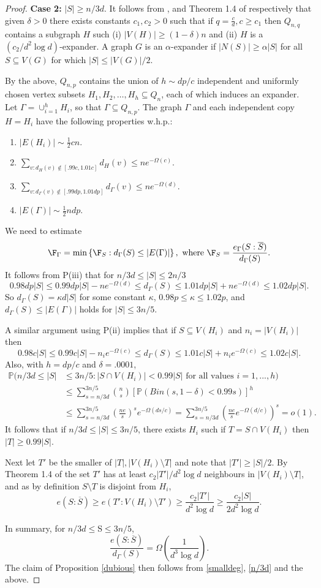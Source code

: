 \documentclass[12pt]{article}
\def\nn{\nonumber}
\def\a{\alpha} \def\b{\beta} \def\d{\delta} \def\D{\Delta}
\def\G{\Gamma} \def\i{\iota} \def\k{\kappa}\def\K{\Kappa}
\newcommand{\ol}[1]{\overline{#1}}
\newcommand{\brac}[1]{\left(#1\right)}
\newcommand{\bfrac}[2]{\left(\frac{#1}{#2}\right)}
\newcommand{\set}[1]{\left\{#1\right\}}
\def\sm{\setminus}
\def\seq{\subseteq}
\def\Pr{\mathbb{P}}
\def\nn{\nonumber}
\begin{document}
\begin{proof}
{\bf Case 2:} $|S | \ge n/3d$.
It follows from \cite{AKS}, and  Theorem 1.4  of \cite{EKK} respectively that given $\d>0$
there exists constants $c_1,c_2>0$ such that if $q=\frac{c}{d},c\geq c_1$ then $Q_{n,q}$ contains a subgraph $H$ such (i) $|V(H)|\geq (1-\d)n$ and (ii) $H$ is a $(c_2/d^2 \log d)$-expander.  A graph $G$ is an $\a$-expander if $|N(S)|\geq \a|S|$ for all $S\subseteq V(G)$ for which $|S|\leq |V(G)|/2$.

By the above, $Q_{n,p}$ contains the union of $ h\sim dp/c$ independent and uniformly chosen vertex subsets $H_1,H_2,\ldots,H_h\subseteq Q_n$, each of which induces an expander.  Let $\G=\cup_{i=1}^h H_i$,
so that $\G \seq Q_{n,p}$.
The graph $\G$ and each independent copy $H=H_i$ have the following properties w.h.p.:
\begin{enumerate}[{P(i).}]
\item $|E(H_i)|\sim \tfrac12 cn$.
\item $\displaystyle {\sum_{v:d_H(v)\notin [.99c,1.01c]}}d_H(v)\leq ne^{-\Omega(c)}$.
\item  $\displaystyle {\sum_{v:d_\G(v)\notin [.99dp,1.01dp]}}d_\G(v)\leq ne^{-\Omega(d)}$.
\item $|E(\G)|\sim \tfrac12 ndp$.
\end{enumerate}
We need to estimate
\[
\F_\G=\min\set{\F_S:d_\G(S)\leq |E(\G)|},\text{ where }\F_S=\frac{e{_\G}(S:\ol S)}{d_\G(S)}.
\]
It follows from P(iii) that for $n/3d\leq |S|\leq 2n/3$
\[
0.98dp|S|\leq 0.99dp|S|-ne^{-\Omega(d)}\leq  d_\G(S) \leq 1.01dp|S|+ne^{-\Omega(d)}\leq  1.02dp|S|.
\]
So $d_\G(S)= \k d|S|$ for some constant $\k$,
$0.98 p \le \k \le 1.02 p$,  and  $d_\G(S)\leq |E(\G)|$ holds for $|S|\leq 3n/5$.


A similar argument using P(ii) implies that if $S\subseteq V(H_i)$ and $n_i=|V(H_i)|$ then
\[
0.98c|S|\leq 0.99c|S|-n_ie^{-\Omega(c)}\leq  d_\G(S) \leq 1.01c|S|+n_ie^{-\Omega(c)}\leq 1.02c|S|.
\]
Also, with $h=dp/c$  and $\d=.0001$,
\begin{align}
\Pr(n/3d\leq |S|&\leq 3n/5: |S\cap V(H_i)|<0.99|S|\text{ for all values } i=1,...,h)\nn\\
&\leq\sum_{s=n/3d}^{3n/5}\binom{n}{s}[\Pr(Bin(s,1-\d)<0.99s)]^{h}\nn\\
&\leq\sum_{s=n/3d}^{3n/5} \bfrac{ne}{s}^se^{-\Omega(ds/c)}=\sum_{s=n/3d}^{3n/5}\brac{\frac{ne}{s}e^{-\Omega(d/c)}}^s=o(1).\label{eq2}
\end{align}
It follows that if $n/3d\leq |S|\leq 3n/5$, there exists $H_i$ such if $T=S\cap V(H_i)$ then $|T|\geq 0.99|S|$.


Next let $T'$ be the smaller of $|T|,|V(H_i)\setminus T|$ and note that $|T'|\geq |S|/2$.
By Theorem 1.4 of \cite{EKK} the set $T'$ has at least ${c_2|T'|}/{d^2\log d}$ neighbours in $|V(H_i)\setminus T|$, and
as by definition $S \sm T$ is disjoint from $H_i$,
\[
e(S:\ol S)\geq e(T':V(H_i)\setminus T')\geq \frac{c_2|T'|}{d^2\log d}\geq \frac{c_2|S|}{2d^2\log d}.
\]


In summary, for $n/3d \le $S$ \le 3n/5$,
\[
\frac{e(S:\ol S)}{d_\G(S)}=\Omega\bfrac{1}{d^3\log d}.
\]
The  claim of Proposition \ref{dubious} then follows from \eqref{smalldeg}, \eqref{n/3d} and the above.
\end{proof}
\end{document}
